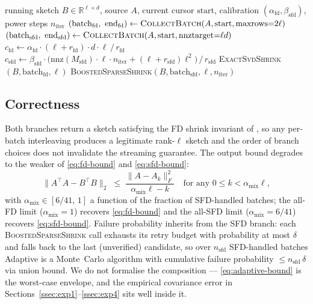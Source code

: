 \documentclass[11pt]{article}
\begin{document}
\begin{algorithm}[t]
\caption{\textsc{AdaptiveShrink} (one step of Adaptive FD/SFD)}
\label{alg:adaptive}
\begin{algorithmic}[1]
\Require running sketch $B \in \mathbb{R}^{\ell \times d}$, source $A$, current cursor $\mathrm{start}$, calibration $(\alpha_{\mathrm{fd}}, \beta_{\mathrm{sfd}})$, power steps $n_{\mathrm{iter}}$
\State $(\mathrm{batch}_{\mathrm{fd}},\ \mathrm{end}_{\mathrm{fd}}) \gets \textsc{CollectBatch}(A, \mathrm{start}, \mathrm{maxrows}{=}2\ell)$
\State $(\mathrm{batch}_{\mathrm{sfd}},\ \mathrm{end}_{\mathrm{sfd}}) \gets \textsc{CollectBatch}(A, \mathrm{start}, \mathrm{nnz target}{=}\ell d)$
\State $c_{\mathrm{fd}} \gets \alpha_{\mathrm{fd}} \cdot (\ell + r_{\mathrm{fd}}) \cdot d \cdot \ell \,/\, r_{\mathrm{fd}}$
\State $c_{\mathrm{sfd}} \gets \beta_{\mathrm{sfd}} \cdot \bigl(\mathrm{nnz}(M_{\mathrm{sfd}}) \cdot \ell \cdot n_{\mathrm{iter}} + (\ell + r_{\mathrm{sfd}})\ell^2\bigr) \,/\, r_{\mathrm{sfd}}$
  \State \Return \textsc{ExactSvdShrink}$(B, \mathrm{batch}_{\mathrm{fd}}, \ell)$
\Else
  \State \Return \textsc{BoostedSparseShrink}$(B, \mathrm{batch}_{\mathrm{sfd}}, \ell, n_{\mathrm{iter}})$
\EndIf
\end{algorithmic}
\end{algorithm}

\subsection{Correctness}
\label{ssec:adaptive-correct}

Both branches return a sketch satisfying the FD shrink invariant of
\cite{liberty2013fd, ghashami2016sfd}, so any per-batch interleaving
produces a legitimate rank-$\ell$ sketch and the order of branch choices
does not invalidate the streaming guarantee. The output bound degrades to
the weaker of \eqref{eq:fd-bound} and \eqref{eq:sfd-bound}:
\begin{equation}
\label{eq:adaptive-bound}
  \|A^\top A - B^\top B\|_2 \;\le\; \frac{\|A - A_k\|_F^2}{\alpha_{\mathrm{mix}}\ell - k}
  \quad\text{for any } 0 \le k < \alpha_{\mathrm{mix}}\ell,
\end{equation}
with $\alpha_{\mathrm{mix}} \in [6/41,\, 1]$ a function of the fraction of
SFD-handled batches; the all-FD limit ($\alpha_{\mathrm{mix}} = 1$) recovers
\eqref{eq:fd-bound} and the all-SFD limit ($\alpha_{\mathrm{mix}} = 6/41$)
recovers \eqref{eq:sfd-bound}. Failure probability inherits from the SFD
branch: each \textsc{BoostedSparseShrink} call exhausts its retry budget
with probability at most $\delta$ and falls back to the last (unverified)
candidate, so over $n_{\mathrm{sfd}}$ SFD-handled batches Adaptive is a
Monte~Carlo algorithm with cumulative failure probability
$\le n_{\mathrm{sfd}}\,\delta$ via union bound. We do not formalise the
composition --- \eqref{eq:adaptive-bound} is the worst-case envelope, and
the empirical covariance error in
Sections~\ref{ssec:exp1}--\ref{ssec:exp4} sits well inside it.
\end{document}
